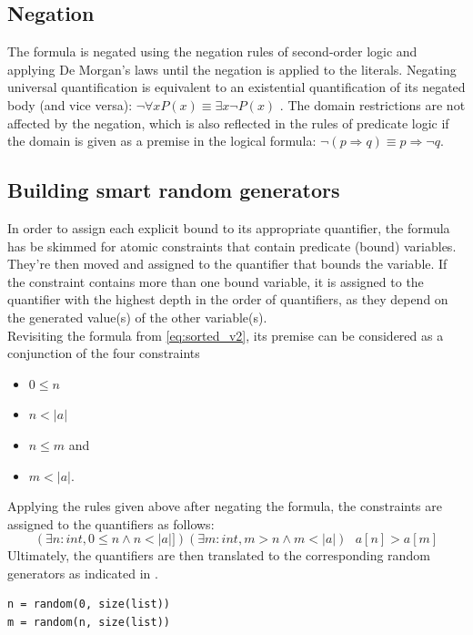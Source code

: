 \subsection{Negation}
The formula is negated using the negation rules of second-order logic and applying De Morgan's laws \cite{de_morgan} until the negation is applied to the literals. Negating universal quantification is equivalent to an existential quantification of its negated body (and vice versa): $\neg \forall x P(x) \equiv \exists x \neg P(x)$ \cite{Sundstrom2020Quantifiers}. The domain restrictions are not affected by the negation, which is also reflected in the rules of predicate logic if the domain is given as a premise in the logical formula: $\neg (p \Rightarrow q) \equiv p \Rightarrow \neg q $.

\subsection{Building smart random generators}
In order to assign each explicit bound to its appropriate quantifier, the formula has be skimmed for atomic constraints that contain predicate (bound) variables. They're then moved and assigned to the quantifier that bounds the variable. If the constraint contains more than one bound variable, it is assigned to the quantifier with the highest depth in the order of quantifiers, as they depend on the generated value(s) of the other variable(s). \\
Revisiting the formula from \eqref{eq:sorted_v2}, its premise can be considered as a conjunction of the four constraints
\begin{itemize}
\itemsep-1em
\item $0 \leq n$
\item $n < |a| $
\item $n \le m$ and
\item $m < |a|$.
\end{itemize}
Applying the rules given above after negating the formula, the constraints are assigned to the quantifiers as follows:
\begin{equation}\label{eq:sorted_v2_bounds}
	(\exists n : int, 0 \leq n \wedge n < |a|])(\exists m : int, m > n \wedge m < |a|) \text{ } a[n] > a[m]
\end{equation}
Ultimately, the quantifiers are then translated to the corresponding random generators as indicated in .
\begin{lstlisting}[label=lst:rand]
n = random(0, size(list))
m = random(n, size(list))
\end{lstlisting}
